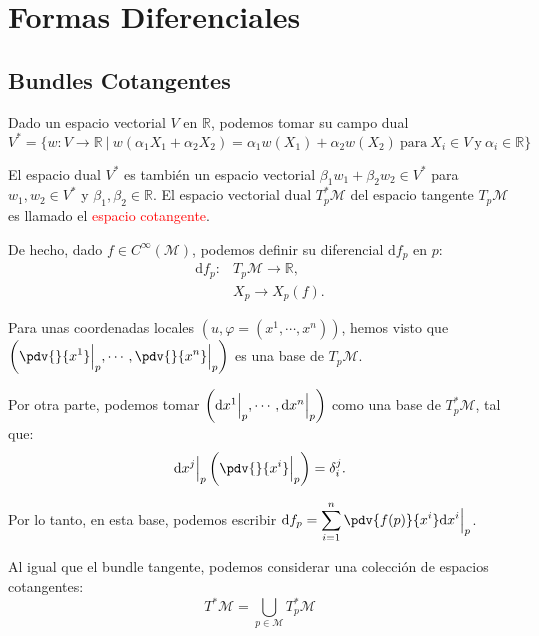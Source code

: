 \documentclass[../main]{subfiles}
\begin{document}
\section{Formas Diferenciales}\label{part1.4}
\subsection{Bundles Cotangentes}
Dado un espacio vectorial $V$ en $\mathbb{R}$, podemos tomar su campo dual 
\begin{equation}
    V^{*}=\{w: V\rightarrow \mathbb{R}\ | \ w(\alpha_1 X_1+\alpha_2 X_2)=\alpha_1 w(X_1)+\alpha_2 w(X_2) \ \text{para} \ X_i \in V \ \text{y} \ \alpha_i \in \mathbb{R}\}
\end{equation}

El espacio dual $V^{*}$ es también un espacio vectorial $\beta_1 w_1+\beta_2 w_2 \in V^{*}$ para $w_1, w_2 \in V^{*}$ y $\beta_1, \beta_2 \in \mathbb{R}$. El espacio vectorial dual $T^{*}_p \mathcal{M}$ del espacio tangente $T_p \mathcal{M}$ es llamado el \textcolor{red}{espacio cotangente}.

De hecho, dado $f \in C^{\infty}(\mathcal{M})$, podemos definir su diferencial $\mathrm{d}f_p$ en $p$:
\begin{equation}
    \begin{split}
        \mathrm{d}f_p:& T_p \mathcal{M} \rightarrow \mathbb{R},\\
        & X_p \rightarrow X_p(f).
    \end{split}
\end{equation}

Para unas coordenadas locales $(u, \varphi=(x^1, \cdots, x^n))$, hemos visto que $\displaystyle \left(\pdv{}{x^1}\Big{|}_p, \cdots, \pdv{}{x^n}\Big{|}_p\right)$ es una base de $T_p\mathcal{M}$.

Por otra parte, podemos tomar $\left(\mathrm{d}x^1\Big{|}_p, \cdots, \mathrm{d}x^n\Big{|}_p\right)$ como una base de $T^{*}_p \mathcal{M}$, tal que: 
\begin{equation}
    \mathrm{d}x^j\Big{|}_p \left(\pdv{}{x^{i}}\Big{|}_p\right)=\delta^j_i.
\end{equation}

Por lo tanto, en esta base, podemos escribir $\displaystyle\mathrm{d}f_p=\sum_{i=1}^n \pdv{f(p)}{x^{i}}\mathrm{d}x^{i}\Big{|}_p$.

Al igual que el bundle tangente, podemos considerar una colección de espacios cotangentes:
\begin{equation}
    T^{*}\mathcal{M}=\bigcup_{p \in \mathcal{M}} T^{*}_p \mathcal{M}
\end{equation}
\end{document}
